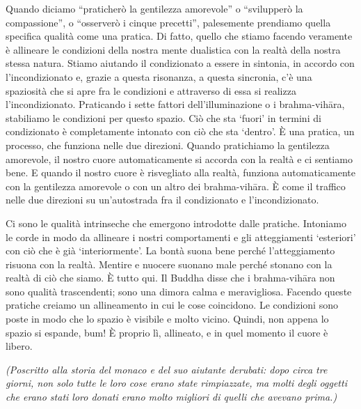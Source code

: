 Quando diciamo ``praticherò la gentilezza amorevole'' o ``svilupperò la compassione'', o ``osserverò i cinque precetti'', palesemente prendiamo quella specifica qualità come una pratica. Di fatto, quello che stiamo facendo veramente è allineare le condizioni della nostra mente dualistica con la realtà della nostra stessa natura. Stiamo aiutando il condizionato a essere in sintonia, in accordo con l'incondizionato e, grazie a questa risonanza, a questa sincronia, c'è una spaziosità che si apre fra le condizioni e attraverso di essa si realizza l'incondizionato. Praticando i sette fattori dell'illuminazione o i brahma-vihāra, stabiliamo le condizioni per questo spazio. Ciò che sta `fuori' in termini di condizionato è completamente intonato con ciò che sta `dentro'. È una pratica, un processo, che funziona nelle due direzioni. Quando pratichiamo la gentilezza amorevole, il nostro cuore automaticamente si accorda con la realtà e ci sentiamo bene. E quando il nostro cuore è risvegliato alla realtà, funziona automaticamente con la gentilezza amorevole o con un altro dei brahma-vihāra. È come il traffico nelle due direzioni su un'autostrada fra il condizionato e l'incondizionato.

Ci sono le qualità intrinseche che emergono introdotte dalle pratiche. Intoniamo le corde in modo da allineare i nostri comportamenti e gli atteggiamenti `esteriori' con ciò che è già `interiormente'. La bontà suona bene perché l'atteggiamento risuona con la realtà. Mentire e nuocere suonano male perché stonano con la realtà di ciò che siamo. È tutto qui. Il Buddha disse che i brahma-vihāra non sono qualità trascendenti; sono una dimora calma e meravigliosa. Facendo queste pratiche creiamo un allineamento in cui le cose coincidono. Le condizioni sono poste in modo che lo spazio è visibile e molto vicino. Quindi, non appena lo spazio si espande, bum! È proprio lì, allineato, e in quel momento il cuore è libero.

\bigskip

\textit{(Poscritto alla storia del monaco e del suo aiutante derubati: dopo circa tre giorni, non solo tutte le loro cose erano state rimpiazzate, ma molti degli oggetti che erano stati loro donati erano molto migliori di quelli che avevano prima.)}

